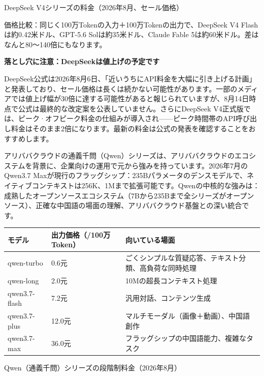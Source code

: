 \begin{center}\small\color{gray}DeepSeek V4シリーズの料金（2026年8月、セール価格）\end{center}

価格比較：同じく100万Tokenの入力＋100万Tokenの出力で、DeepSeek V4 Flashは約0.42米ドル、GPT-5.6 Solは約35米ドル、Claude Fable 5は約60米ドル。差はなんと80〜140倍にもなります。

\textbf{落とし穴に注意：DeepSeekは値上げの予定です}\par

DeepSeek公式は2026年8月6日、「近いうちにAPI料金を大幅に引き上げる計画」と発表しており、セール価格は長くは続かない可能性があります。一部のメディアでは値上げ幅が30倍に達する可能性があると報じられていますが、8月14日時点で公式は最終的な改定案を公表していません。さらにDeepSeek V4正式版では、ピーク·オフピーク料金の仕組みが導入され——ピーク時間帯のAPI呼び出し料金はそのまま2倍になります。最新の料金は公式の発表を確認することをおすすめします。


アリババクラウドの通義千問（Qwen）シリーズは、アリババクラウドのエコシステムを背景に、企業向けの運用で元から強みを持っています。2026年7月のQwen3.7 Maxが現行のフラッグシップ：235Bパラメータのデンスモデルで、ネイティブコンテキストは256K、1Mまで拡張可能です。Qwenの中核的な強みは：成熟したオープンソースエコシステム（7Bから235Bまで全シリーズがオープンソース）、正確な中国語の場面の理解、アリババクラウド基盤との深い統合です。

\begin{center}
\begin{tabularx}{\linewidth}{|X|X|X|}
\hline
\textbf{モデル} & \textbf{出力価格（/100万Token）} & \textbf{向いている場面} \tabularnewline
\hline
qwen-turbo & 0.6元 & ごくシンプルな質疑応答、テキスト分類、高負荷な同時処理 \tabularnewline
qwen-long & 2.0元 & 10Mの超長コンテキスト処理 \tabularnewline
qwen3.7-flash & 7.2元 & 汎用対話、コンテンツ生成 \tabularnewline
qwen3.7-plus & 12.0元 & マルチモーダル（画像＋動画）、中国語創作 \tabularnewline
qwen3.7-max & 36.0元 & フラッグシップの中国語能力、複雑なタスク \tabularnewline
\hline
\end{tabularx}
\end{center}

\begin{center}\small\color{gray}Qwen（通義千問）シリーズの段階制料金（2026年8月）\end{center}


